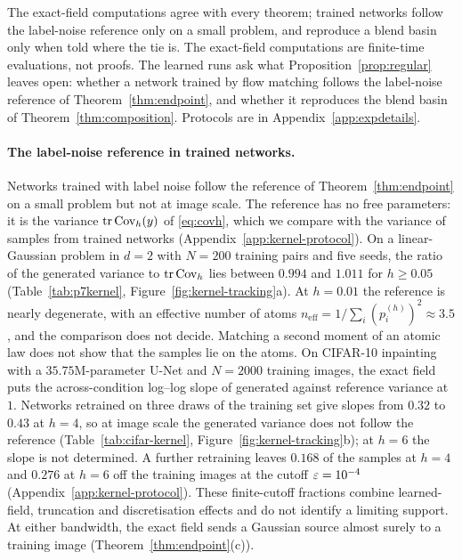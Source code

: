\documentclass{article} %
\theoremstyle{plain}
\theoremstyle{definition}
\theoremstyle{remark}
\begin{document}
The exact-field computations agree with every theorem; trained networks follow the label-noise
reference only on a small problem, and reproduce a blend basin only when told where the tie is.
The exact-field computations are finite-time evaluations, not proofs. The learned runs ask what
Proposition~\ref{prop:regular} leaves open: whether a network trained by flow matching follows the
label-noise reference of Theorem~\ref{thm:endpoint}, and whether it reproduces the blend basin of
Theorem~\ref{thm:composition}. Protocols are in Appendix~\ref{app:expdetails}.

\paragraph{The label-noise reference in trained networks.} Networks trained with label noise
follow the reference of Theorem~\ref{thm:endpoint} on a small problem but not at image scale. The
reference has no free parameters: it is the variance $\operatorname{tr}\operatorname{Cov}_h(y)$ of \eqref{eq:covh}, which we
compare with the variance of samples from trained networks (Appendix~\ref{app:kernel-protocol}).
On a linear-Gaussian problem in $d=2$ with $N=200$ training pairs and five seeds, the ratio of the
generated variance to $\operatorname{tr}\operatorname{Cov}_h$ lies between $0.994$ and $1.011$ for $h\ge0.05$
(Table~\ref{tab:p7kernel}, Figure~\ref{fig:kernel-tracking}a). At $h=0.01$ the reference is nearly
degenerate, with an effective number of atoms $n_{\mathrm{eff}}=1/\sum_i(p_i^{(h)})^2\approx3.5$,
and the comparison does not decide. Matching a second moment of an atomic law does not show that
the samples lie on the atoms. On CIFAR-10 inpainting with a $35.75$M-parameter U-Net and $N=2000$
training images, the exact field puts the across-condition log--log slope of generated against
reference variance at $1$. Networks retrained on three draws of the training set give slopes from
$0.32$ to $0.43$ at $h=4$, so at image scale the generated variance does not follow the reference
(Table~\ref{tab:cifar-kernel}, Figure~\ref{fig:kernel-tracking}b); at $h=6$ the slope is not
determined. A further retraining leaves $0.168$ of the samples at $h=4$ and $0.276$ at $h=6$ off
the training images at the cutoff $\varepsilon=10^{-4}$ (Appendix~\ref{app:kernel-protocol}). These
finite-cutoff fractions combine learned-field, truncation and discretisation effects and do not
identify a limiting support. At either bandwidth, the exact field sends a Gaussian source almost
surely to a training image (Theorem~\ref{thm:endpoint}(c)).
\end{document}
